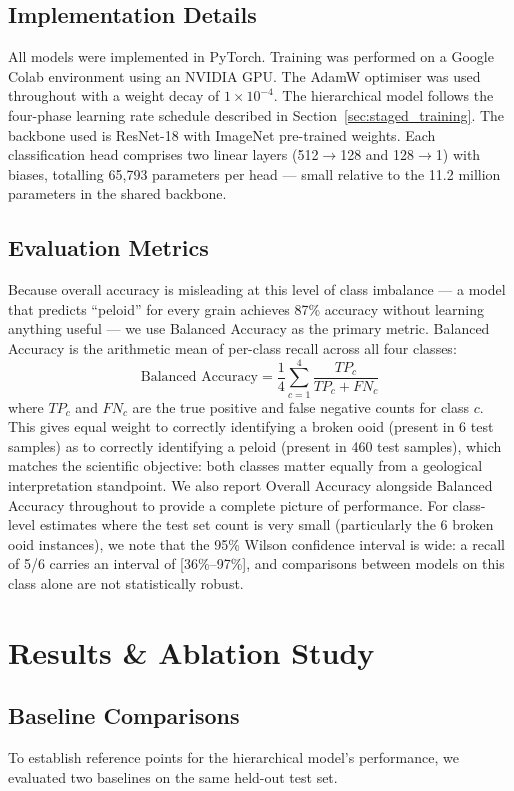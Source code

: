 \documentclass[a4paper,fleqn]{cas-dc}
\begin{document}
\subsection{Implementation Details}
All models were implemented in PyTorch. Training was performed on a Google Colab environment using an NVIDIA GPU. The AdamW optimiser was used throughout with a weight decay of $1\times10^{-4}$. The hierarchical model follows the four-phase learning rate schedule described in Section~\ref{sec:staged_training}. The backbone used is ResNet-18 with ImageNet pre-trained weights. Each classification head comprises two linear layers (512$\rightarrow$128 and 128$\rightarrow$1) with biases, totalling 65,793 parameters per head --- small relative to the 11.2 million parameters in the shared backbone.

\subsection{Evaluation Metrics}
Because overall accuracy is misleading at this level of class imbalance --- a model that predicts ``peloid'' for every grain achieves 87\% accuracy without learning anything useful --- we use Balanced Accuracy as the primary metric. Balanced Accuracy is the arithmetic mean of per-class recall across all four classes:
\begin{equation}
\text{Balanced Accuracy} = \frac{1}{4}\sum_{c=1}^{4} \frac{TP_c}{TP_c + FN_c}
\end{equation}
where $TP_c$ and $FN_c$ are the true positive and false negative counts for class $c$. This gives equal weight to correctly identifying a broken ooid (present in 6 test samples) as to correctly identifying a peloid (present in 460 test samples), which matches the scientific objective: both classes matter equally from a geological interpretation standpoint. We also report Overall Accuracy alongside Balanced Accuracy throughout to provide a complete picture of performance. For class-level estimates where the test set count is very small (particularly the 6 broken ooid instances), we note that the 95\% Wilson confidence interval is wide: a recall of 5/6 carries an interval of [36\%--97\%], and comparisons between models on this class alone are not statistically robust.

\section{Results \& Ablation Study}

\subsection{Baseline Comparisons}
To establish reference points for the hierarchical model's performance, we evaluated two baselines on the same held-out test set.
\end{document}
